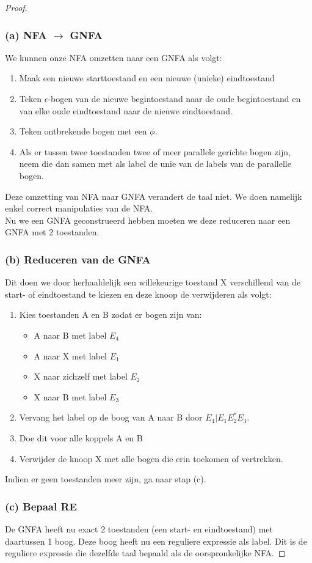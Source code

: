 \begin{proof}
\subsubsection*{(a) NFA $\rightarrow$ GNFA}
We kunnen onze NFA omzetten naar een GNFA als volgt:
\begin{enumerate}
\item Maak een nieuwe starttoestand en een nieuwe (unieke) eindtoestand
\item Teken $\epsilon$-bogen van de nieuwe begintoestand naar de oude begintoestand en van elke oude eindtoestand naar de nieuwe eindtoestand.
\item Teken ontbrekende bogen met een $\phi$.
\item Als er tussen twee toestanden twee of meer parallele gerichte bogen zijn, neem die dan samen met als label de unie van de labels van de parallelle bogen.
\end{enumerate}
Deze omzetting van NFA naar GNFA verandert de taal niet. We doen namelijk enkel correct manipulaties van de NFA.\\
Nu we een GNFA geconstrueerd hebben moeten we deze reduceren naar een GNFA met 2 toestanden.

\subsubsection*{(b) Reduceren van de GNFA}
Dit doen we door herhaaldelijk een willekeurige toestand X verschillend van de start- of eindtoestand te kiezen en deze knoop de verwijderen als volgt:
\begin{enumerate}
\item Kies toestanden A en B zodat er bogen zijn van: 
\begin{itemize}
\item A naar B met label $E_4$
\item A naar X met label $E_1$
\item X naar zichzelf met label $E_2$
\item X naar B met label $E_3$
\end{itemize}
\item Vervang het label op de boog van A naar B door $E_4 | E_1 E_2^* E_3$.
\item Doe dit voor alle koppels A en B
\item Verwijder de knoop X met alle bogen die erin toekomen of vertrekken.
\end{enumerate}
Indien er geen toestanden meer zijn, ga naar stap (c).

\subsubsection*{(c) Bepaal RE}
De GNFA heeft nu exact 2 toestanden (een start- en eindtoestand) met daartussen 1 boog. Deze boog heeft nu een reguliere expressie als label. Dit is de reguliere expressie die dezelfde taal bepaald als de oorspronkelijke NFA.
\end{proof}

